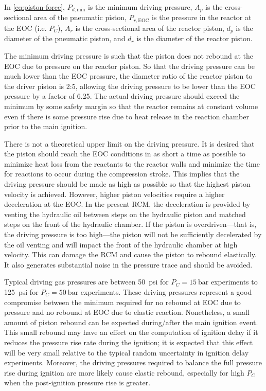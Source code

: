 \documentclass[../main.tex]{subfiles}
\begin{document}
In \cref{eq:piston-force}, $P_{d,\text{min}}$ is the minimum
driving pressure, $A_p$ is the cross-sectional area of the pneumatic piston,
$P_{r,\text{EOC}}$ is the pressure in the reactor at the EOC (i.e. $P_C$),
$A_r$ is the cross-sectional area of the reactor piston, $d_p$ is the diameter
of the pneumatic piston, and $d_r$ is the diameter of the reactor piston.

The minimum driving pressure is such that the piston does not rebound at
the EOC due to pressure on the reactor piston. So that the driving
pressure can be much lower than the EOC pressure, the diameter ratio of
the reactor piston to the driver piston is 2:5, allowing the driving pressure
to be lower than the EOC pressure by a factor of 6.25. The actual driving
pressure should exceed the minimum by some safety margin so that the
reactor remains at constant volume even if there is some pressure rise
due to heat release in the reaction chamber prior to the main ignition.

There is not a theoretical upper limit on the driving pressure. It is desired that the piston should
reach the EOC conditions in as short a time as possible to minimize heat
loss from the reactants to the reactor walls and minimize the time for
reactions to occur during the compression stroke. This implies that the
driving pressure should be made as high as possible so that the highest
piston velocity is achieved. However, higher piston velocities require
a higher deceleration at the EOC. In the present RCM, the deceleration
is provided by venting the hydraulic oil between steps on the hydraulic
piston and matched steps on the front of the hydraulic chamber. If the
piston is overdriven---that is, the driving pressure is too high---the
piston will not be sufficiently decelerated by the oil venting and will
impact the front of the hydraulic chamber at high velocity. This can damage
the RCM and cause the piston to rebound elastically. It also generates
substantial noise in the pressure trace and should be avoided.

Typical driving gas pressures are between \SI{50}{psi} for $P_C = \SI{15}{\bar}$ experiments
to  \SI{125}{psi} for $P_C = \SI{50}{\bar}$ experiments. These driving pressures represent a
good compromise between the minimum required for no rebound at EOC due
to pressure and no rebound at EOC due to elastic reaction. Nonetheless,
a small amount of piston rebound can be expected during/after the
main ignition event. This small rebound may have an effect on the computation of
ignition delay if it reduces the pressure rise rate during the ignition;
it is expected that this effect will be very small relative to the
typical random uncertainty in ignition delay experiments. Moreover,
the driving pressures required to balance the full pressure rise during
ignition are more likely cause elastic rebound,
especially for high $P_C$ when the post-ignition pressure rise is greater.
\end{document}
